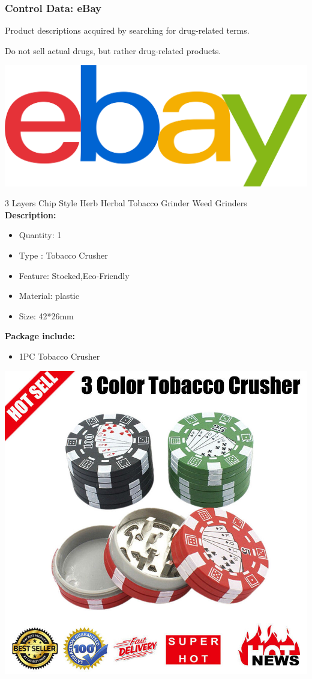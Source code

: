 \documentclass[t,xcolor={svgnames,table}]{beamer}
\begin{document}
\begin{frame}[fragile]
	\frametitle{Control Data: eBay}
	Product descriptions acquired by searching for drug-related terms.
	\vfill
	
	Do not sell actual drugs, but rather drug-related products.
	\vfill
	
	\begin{center}
	\includegraphics[width=.5\textwidth]{ebay.png}
	\end{center}
	\vfill
	\pause
	
	\colorbox{green!30}{\parbox{\textwidth}{\scriptsize\rm
	3 Layers  Chip Style Herb Herbal Tobacco Grinder Weed Grinders\\
	\textbf{Description:}
	\begin{itemize}
	\item Quantity: 1\\
	\item Type : Tobacco Crusher\\
	\item Feature: Stocked,Eco-Friendly\\
	\item Material: plastic\\
	\item Size: 42*26mm
	\end{itemize}
	\textbf{Package include:}
	\begin{itemize}
	\item 1PC  Tobacco Crusher
	\end{itemize}
	}}
	
	\vspace{-36mm}
	\begin{flushright}
	\includegraphics[trim={5cm 6cm 3cm 4cm},clip,width=.3\textwidth]{s-l1600.jpg}
	\end{flushright}
\end{frame}
\end{document}
